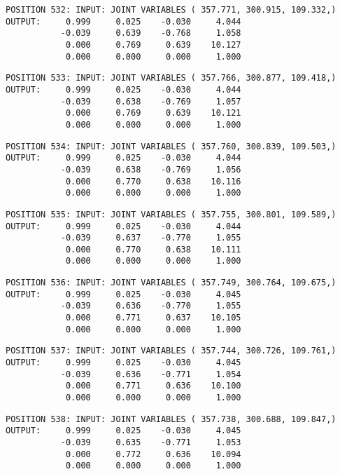 \begin{verbatim}
POSITION 532: INPUT: JOINT VARIABLES ( 357.771, 300.915, 109.332,)
OUTPUT:     0.999     0.025    -0.030     4.044
           -0.039     0.639    -0.768     1.058
            0.000     0.769     0.639    10.127
            0.000     0.000     0.000     1.000
\end{verbatim} \pagebreak[1]\begin{verbatim}
POSITION 533: INPUT: JOINT VARIABLES ( 357.766, 300.877, 109.418,)
OUTPUT:     0.999     0.025    -0.030     4.044
           -0.039     0.638    -0.769     1.057
            0.000     0.769     0.639    10.121
            0.000     0.000     0.000     1.000
\end{verbatim} \pagebreak[1]\begin{verbatim}
POSITION 534: INPUT: JOINT VARIABLES ( 357.760, 300.839, 109.503,)
OUTPUT:     0.999     0.025    -0.030     4.044
           -0.039     0.638    -0.769     1.056
            0.000     0.770     0.638    10.116
            0.000     0.000     0.000     1.000
\end{verbatim} \pagebreak[1]\begin{verbatim}
POSITION 535: INPUT: JOINT VARIABLES ( 357.755, 300.801, 109.589,)
OUTPUT:     0.999     0.025    -0.030     4.044
           -0.039     0.637    -0.770     1.055
            0.000     0.770     0.638    10.111
            0.000     0.000     0.000     1.000
\end{verbatim} \pagebreak[1]\begin{verbatim}
POSITION 536: INPUT: JOINT VARIABLES ( 357.749, 300.764, 109.675,)
OUTPUT:     0.999     0.025    -0.030     4.045
           -0.039     0.636    -0.770     1.055
            0.000     0.771     0.637    10.105
            0.000     0.000     0.000     1.000
\end{verbatim} \pagebreak[1]\begin{verbatim}
POSITION 537: INPUT: JOINT VARIABLES ( 357.744, 300.726, 109.761,)
OUTPUT:     0.999     0.025    -0.030     4.045
           -0.039     0.636    -0.771     1.054
            0.000     0.771     0.636    10.100
            0.000     0.000     0.000     1.000
\end{verbatim} \pagebreak[1]\begin{verbatim}
POSITION 538: INPUT: JOINT VARIABLES ( 357.738, 300.688, 109.847,)
OUTPUT:     0.999     0.025    -0.030     4.045
           -0.039     0.635    -0.771     1.053
            0.000     0.772     0.636    10.094
            0.000     0.000     0.000     1.000
\end{verbatim} \pagebreak[1]\begin{verbatim}

\end{verbatim}
